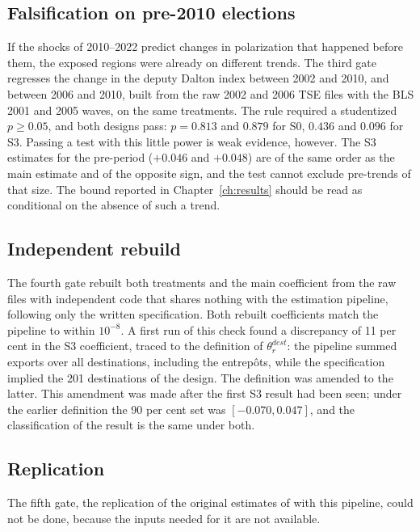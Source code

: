 \documentclass[
	11pt,				%
	oneside,			%
	a4paper,			%
	english,			%
	english				%
	]{abntex2ppgsi}
\theoremstyle{plain}
\theoremstyle{remark}
\theoremstyle{plain}%
\theoremstyle{remark}%
\begin{document}
\subsection{Falsification on pre-2010 elections}

If the shocks of 2010--2022 predict changes in polarization that happened before them, the exposed regions were already on different trends. The third gate regresses the change in the deputy Dalton index between 2002 and 2010, and between 2006 and 2010, built from the raw 2002 and 2006 TSE files with the BLS 2001 and 2005 waves, on the same treatments. The rule required a studentized $p \geq 0.05$, and both designs pass: $p = 0.813$ and $0.879$ for S0, $0.436$ and $0.096$ for S3. Passing a test with this little power is weak evidence, however. The S3 estimates for the pre-period ($+0.046$ and $+0.048$) are of the same order as the main estimate and of the opposite sign, and the test cannot exclude pre-trends of that size. The bound reported in Chapter~\ref{ch:results} should be read as conditional on the absence of such a trend.

\subsection{Independent rebuild}

The fourth gate rebuilt both treatments and the main coefficient from the raw files with independent code that shares nothing with the estimation pipeline, following only the written specification. Both rebuilt coefficients match the pipeline to within $10^{-8}$. A first run of this check found a discrepancy of 11 per cent in the S3 coefficient, traced to the definition of $\theta^{dest}_r$: the pipeline summed exports over all destinations, including the entrepôts, while the specification implied the 201 destinations of the design. The definition was amended to the latter. This amendment was made after the first S3 result had been seen; under the earlier definition the 90 per cent set was $[-0.070, 0.047]$, and the classification of the result is the same under both.

\subsection{Replication}

The fifth gate, the replication of the original estimates of  with this pipeline, could not be done, because the inputs needed for it are not available.
\end{document}
